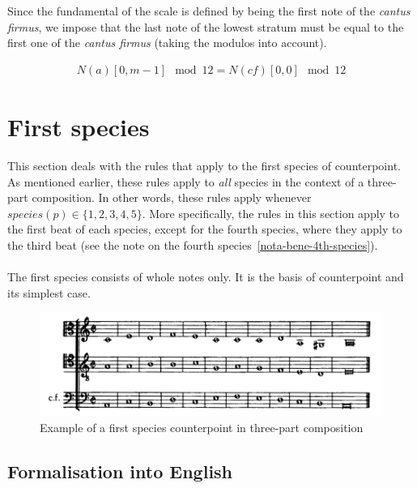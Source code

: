     Since the fundamental of the scale is defined by being the first note of the \textit{cantus firmus}, we impose that the last note of the lowest stratum must be equal to the first one of the \textit{cantus firmus} (taking the modulos into account).
    
    
    \begin{equation} \begin{aligned}
    N(a)[0, m-1] \mod 12 = N(cf)[0, 0] \mod 12
    \end{aligned} \end{equation}

\section{First species}
This section deals with the rules that apply to the first species of counterpoint. As mentioned earlier, these rules apply to \textit{all} species in the context of a three-part composition. In other words, these rules apply whenever $species(p) \in \{1, 2, 3, 4, 5\}$. More specifically, the rules in this section apply to the first beat of each species, except for the fourth species, where they apply to the third beat (see the note on the fourth species~\ref{nota-bene-4th-species}).

\paragraph{}
The first species consists of whole notes only. It is the basis of counterpoint and its simplest case. 

\begin{figure}[h]
    \centering
    \includegraphics[width=1\textwidth]{Images/Species_examples/1sp-example.png}
    \caption{Example of a first species counterpoint in three-part composition}
    \label{fig:example-1sp}
\end{figure}

\subsection{Formalisation into English}
